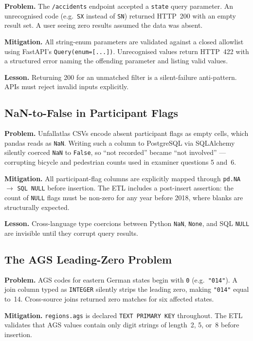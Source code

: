 \documentclass[12pt,a4paper]{article}
\begin{document}
\textbf{Problem.} The \texttt{/accidents} endpoint accepted a \texttt{state} query parameter. An unrecognised code (e.g.\ \texttt{SX} instead of \texttt{SN}) returned HTTP~200 with an empty result set. A user seeing zero results assumed the data was absent.

\textbf{Mitigation.} All string-enum parameters are validated against a closed allowlist using FastAPI's \texttt{Query(enum=[...])}. Unrecognised values return HTTP~422 with a structured error naming the offending parameter and listing valid values.

\textbf{Lesson.} Returning 200 for an unmatched filter is a silent-failure anti-pattern. APIs must reject invalid inputs explicitly.

\subsection{NaN-to-False in Participant Flags}

\textbf{Problem.} Unfallatlas CSVs encode absent participant flags as empty cells, which pandas reads as \texttt{NaN}. Writing such a column to PostgreSQL via SQLAlchemy silently coerced \texttt{NaN} to \texttt{False}, so ``not recorded'' became ``not involved'' --- corrupting bicycle and pedestrian counts used in examiner questions 5 and~6.

\textbf{Mitigation.} All participant-flag columns are explicitly mapped through \texttt{pd.NA} $\rightarrow$ \texttt{SQL NULL} before insertion. The ETL includes a post-insert assertion: the count of \texttt{NULL} flags must be non-zero for any year before 2018, where blanks are structurally expected.

\textbf{Lesson.} Cross-language type coercions between Python \texttt{NaN}, \texttt{None}, and SQL \texttt{NULL} are invisible until they corrupt query results.

\subsection{The AGS Leading-Zero Problem}

\textbf{Problem.} AGS codes for eastern German states begin with \texttt{0} (e.g.\ \texttt{"014"}). A join column typed as \texttt{INTEGER} silently strips the leading zero, making \texttt{"014"} equal to~14. Cross-source joins returned zero matches for six affected states.

\textbf{Mitigation.} \texttt{regions.ags} is declared \texttt{TEXT PRIMARY KEY} throughout. The ETL validates that AGS values contain only digit strings of length~2, 5, or~8 before insertion.
\end{document}
